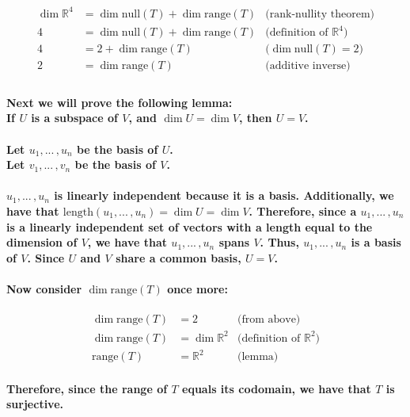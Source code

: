 \documentclass{article}
\begin{document}
\begin{align*}
    \dim \mathbb{R}^4 &= \dim \mathrm{null}(T) + \dim \mathrm{range}(T) & \text{(rank-nullity theorem)}\\
    4 &= \dim \mathrm{null}(T) + \dim \mathrm{range}(T) & \text{(definition of $\mathbb{R}^4$)}\\
    4 &= 2 + \dim \mathrm{range}(T) & \text{($\dim \mathrm{null}(T) = 2$)}\\
    2 &= \dim \mathrm{range}(T) & \text{(additive inverse)}\\
\end{align*}

\paragraph{\large
Next we will prove the following lemma:
\\ If $U$ is a subspace of $V$, and $\dim U = \dim V$, then $U = V$.
\\
\\Let $u_1,...\,,u_n$ be the basis of $U$.
\\Let $v_1,...\,,v_n$ be the basis of $V$.
\\
\\$u_1,...\,,u_n$ is linearly independent because it is a basis. Additionally, we have that $\mathrm{length}(u_1,...\,,u_n) = \dim U = \dim V$. Therefore, since a $u_1,...\,,u_n$ is a linearly independent set of vectors with a length equal to the dimension of $V$, we have that $u_1,...\,,u_n$ spans $V$. Thus, $u_1,...\,,u_n$ is a basis of $V$. Since $U$ and $V$ share a common basis, $U = V$.}

\paragraph{\large
Now consider $\dim \mathrm{range}(T)$ once more:}

\begin{align*}
    \dim \mathrm{range}(T) &= 2 & \text{(from above)}\\
    \dim \mathrm{range}(T) &= \dim \mathbb{R}^2 & \text{(definition of $\mathbb{R}^2$)}\\
    \mathrm{range}(T) &= \mathbb{R}^2 & \text{(lemma)}
\end{align*}

\paragraph{\large
Therefore, since the range of $T$ equals its codomain, we have that $T$ is surjective.}
\end{document}
